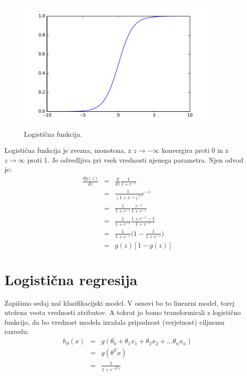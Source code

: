 \begin{figure}[htbp]
\begin{center}
\includegraphics[width=10cm]{slike/logistic.pdf}
\caption{Logistična funkcija.}
\label{f:logistic-function}
\end{center}
\end{figure}

Logistična funkcija je zvezna, monotona, z $z\to -\infty$ konvergira proti 0 in z $z\to\infty$ proti 1. Je odvedljiva pri vseh vrednosti njenega parametra. Njen odvod je:
\begin{eqnarray}
  \frac{dg(z)}{dz} & = & \frac{d}{dz} \frac{1}{1+e^{-z}} \nonumber \\
  & = & \frac{1}{(1+e^{-z})^2} e^{-z} \nonumber \\
  & = & \frac{1}{1+e^{-z}}\frac{e^{-z}}{1+e^{-z}} \nonumber \\
  & = & \frac{1}{1+e^{-z}}\frac{1+e^{-z}-1}{1+e^{-z}} \nonumber \\
  & = & \frac{1}{1+e^{-z}}\big(1-\frac{1}{1+e^{-z}}\big) \nonumber \\
  & = & g(z)[1-g(z)]
\end{eqnarray}

\section{Logistična regresija}

Zapišimo sedaj naš klasifikacijski model. V osnovi bo to linearni model, torej utežena vsota vrednosti atributov. A tokrat jo bomo transformirali z logistično funkcijo, da bo vrednost modela izražala pripadnost (verjetnost) ciljnemu razredu:
\begin{eqnarray}
  h_\theta(x) & = & g(\theta_0+\theta_1 x_1+\theta_2 x_2+\ldots\theta_n x_n)
  \nonumber \\
  & = & g(\theta^T x) \nonumber \\
  & = & \frac{1}{1+e^{-\theta^T x}}
  \label{eq:logreg}
\end{eqnarray}

